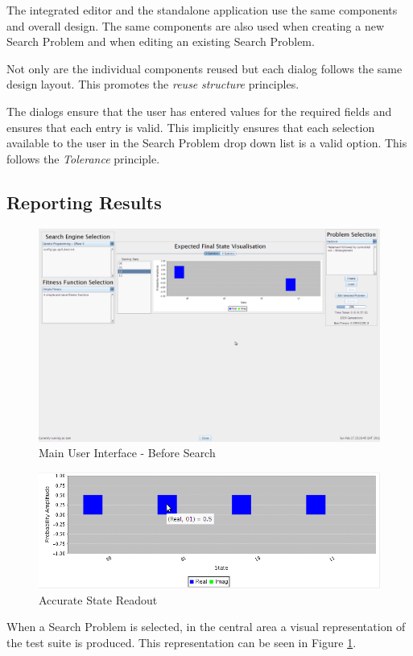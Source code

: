 The integrated editor and the standalone application use the same components and overall design.
The same components are also used when creating a new Search Problem and when editing an existing Search Problem.

Not only are the individual components reused but each dialog follows the same design layout.
This promotes the \emph{reuse} \emph{structure} principles.

The dialogs ensure that the user has entered values for the required fields and ensures that each entry is valid.
This implicitly ensures that each selection available to the user in the Search Problem drop down list is a valid option.
This follows the \emph{Tolerance} principle.

\subsection{Reporting Results}

\begin{figure}
 \includegraphics[width=\textwidth]{GUIDesignProgress.png}
\caption{Main User Interface - Before Search}
\label{fig:MainGUIDesignProg}
\end{figure}
\begin{figure}
 \includegraphics[width=\textwidth]{AccurateReadOutMouseOver.png}
\caption{Accurate State Readout}
\label{fig:AccStateReadOut}
\end{figure}
When a Search Problem is selected, in the central area a visual representation of the test suite is produced.
This representation can be seen in Figure \ref{fig:MainGUIDesignProg}.

